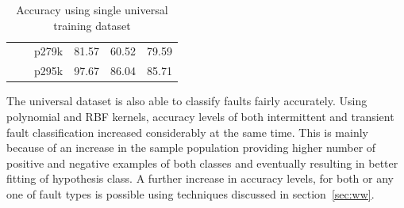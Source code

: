 \begin{table}[h]
{\begin{tabular}{cccccc}
                            &                                                 & p279k                    & 81.57            & 60.52         & 79.59                      \\
                            &                                                 & p295k                    & 97.67            & 86.04         & 85.71     \\
\hline                
\end{tabular}
}
\caption{Accuracy using single universal training dataset}
\label{tab:universal}
\end{table}

The universal dataset is also able to classify faults fairly accurately. Using polynomial and RBF kernels, accuracy levels of both intermittent and transient fault classification increased considerably at the same time. This is mainly because of an increase in the sample population providing  higher number of positive and negative examples of both classes and eventually resulting in better fitting of hypothesis class. A further increase in accuracy levels, for both or any one of fault types is possible using techniques discussed in section~\ref{sec:ww}.


